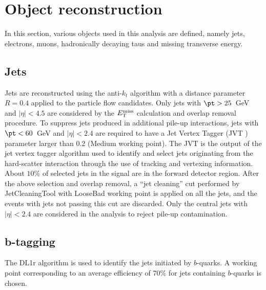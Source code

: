 \section{Object reconstruction}
\label{sec:obj_reco}

In this section, various objects used in this analysis are defined, namely jets, electrons, muons, hadronically decaying taus and missing transverse energy. 

\subsection{Jets}
Jets are reconstructed using the anti-$k_t$ algorithm \cite{antikt} with a distance parameter $R=0.4$ applied to the particle flow candidates. Only jets with $\pt>25$~GeV and $|\eta|<4.5$ are considered by the $E_{\text{T}}^{\text{miss}}$ calculation and overlap removal procedure. To suppress jets produced in additional pile-up interactions, jets with $\pt<60$~GeV and $|\eta|<2.4$ are required to have a Jet Vertex Tagger (JVT \cite{JVT}) parameter larger than 0.2 (Medium working point). The JVT is the output of the jet vertex tagger algorithm used to identify and select jets originating from the hard-scatter interaction through the use of tracking and vertexing information. About $10\%$ of selected jets in the signal are in the forward detector region. After the above selection and overlap removal, a ``jet cleaning'' cut performed by JetCleaningTool with LooseBad working point is applied on all the jets, and the events with jets not passing this cut are discarded. Only the central jets with $|\eta|<2.4$ are considered in the analysis to reject pile-up contamination.

\subsection{b-tagging}
The {\texttt\scriptsize DL1r} \cite{btag1} algorithm is used to identify the jets initiated by $b$-quarks. A working point corresponding to an average efficiency of 70\% for jets containing $b$-quarks is chosen.

